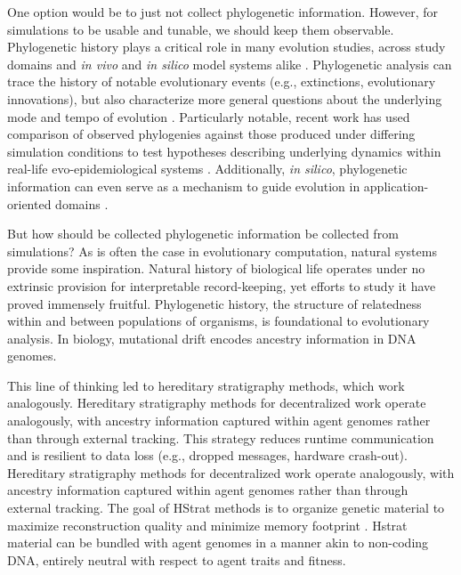 One option would be to just not collect phylogenetic information.
However, for simulations to be usable and tunable, we should keep them observable.
Phylogenetic history plays a critical role in many evolution studies, across study domains and \textit{in vivo} and \textit{in silico} model systems alike \citep{faithConservationEvaluationPhylogenetic1992, STAMATAKIS2005phylogenetics,frenchHostPhylogenyShapes2023,kim2006discovery,lewinsohnStatedependentEvolutionaryModels2023a,lenski2003evolutionary}.
Phylogenetic analysis can trace the history of notable evolutionary events (e.g., extinctions, evolutionary innovations), but also characterize more general questions about the underlying mode and tempo of evolution \citep{moreno2023toward,hernandez2022can,shahbandegan2022untangling,lewinsohnStatedependentEvolutionaryModels2023a}.
Particularly notable, recent work has used comparison of observed phylogenies against those produced under differing simulation conditions to test hypotheses describing underlying dynamics within real-life evo-epidemiological systems \citep{giardina2017inference,voznica2022deep}.
Additionally, \textit{in silico}, phylogenetic information can even serve as a mechanism to guide evolution in application-oriented domains \citep{lalejini2024phylogeny,lalejini2024runtime,murphy2008simple,burke2003increased}.

But how should be collected phylogenetic information be collected from simulations?
As is often the case in evolutionary computation, natural systems provide some inspiration.
Natural history of biological life operates under no extrinsic provision for interpretable record-keeping, yet efforts to study it have proved immensely fruitful.
Phylogenetic history, the structure of relatedness within and between populations of organisms, is foundational to evolutionary analysis.
In biology, mutational drift encodes ancestry information in DNA genomes.

This line of thinking led to hereditary stratigraphy methods, which work analogously.
Hereditary stratigraphy methods for decentralized work operate analogously, with ancestry information captured within agent genomes rather than through external tracking.
This strategy reduces runtime communication and is resilient to data loss (e.g., dropped messages, hardware crash-out).
Hereditary stratigraphy methods for decentralized work operate analogously, with ancestry information captured within agent genomes rather than through external tracking.
The goal of HStrat methods is to organize genetic material to maximize reconstruction quality and minimize memory footprint \citep{moreno2022hstrat, moreno2022hereditary}.
Hstrat material can be bundled with agent genomes in a manner akin to non-coding DNA, entirely neutral with respect to agent traits and fitness.

